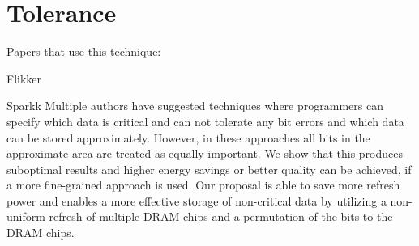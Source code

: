 \section{Tolerance} 
\label{sec:tol}

Papers that use this technique:

Flikker\cite{flikker}

Sparkk\cite{sparkk}
Multiple authors have suggested techniques where programmers can specify which data is critical and can not tolerate any bit errors and which data can be stored approximately. However, in these approaches all bits in the approximate area are treated as equally important. We show that this produces suboptimal results and higher energy savings or better quality can be achieved, if a more fine-grained approach is used. Our proposal is able to save more refresh power and enables a more effective storage of non-critical data by utilizing a non-uniform refresh of multiple DRAM chips and a permutation of the bits to the DRAM chips. 